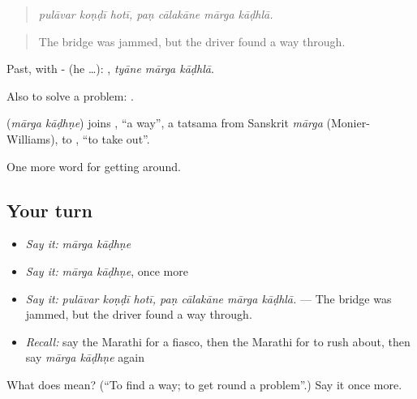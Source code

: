 \begin{quote}
\emph{pulāvar koṇḍī hotī, paṇ cālakāne mārga kāḍhlā.}
\end{quote}

\begin{quote}
The bridge was jammed, but the driver found a way through.
\end{quote}

Past, with - (he …):   , \emph{tyāne mārga kāḍhlā}.

Also to solve a problem:   .

\begin{cousinweb}
\textbf{ } (\emph{mārga kāḍhṇe}) joins \textbf{}, \textquotedblleft{}a way\textquotedblright{}, a tatsama from Sanskrit \emph{mārga} (Monier-Williams), to \textbf{}, \textquotedblleft{}to take out\textquotedblright{}.
\end{cousinweb}

\begin{grammarlens}[title={What you've built}]
One more word for getting around.
\end{grammarlens}

\subsection*{Your turn}
\begin{itemize}
\raggedright
  \item \emph{Say it:} \emph{mārga kāḍhṇe}
  \item \emph{Say it:} \emph{mārga kāḍhṇe}, once more
  \item \emph{Say it:} \emph{pulāvar koṇḍī hotī, paṇ cālakāne mārga kāḍhlā.} — The bridge was jammed, but the driver found a way through.
  \item \emph{Recall:} say the Marathi for a fiasco, then the Marathi for to rush about, then say \emph{mārga kāḍhṇe} again
\end{itemize}

\begin{tcolorbox}[breakable,colback=teal!4,colframe=teal!35!black,title={Before you move on}]
What does   mean? (\textquotedblleft{}To find a way; to get round a problem\textquotedblright{}.) Say it once more.
\end{tcolorbox}

